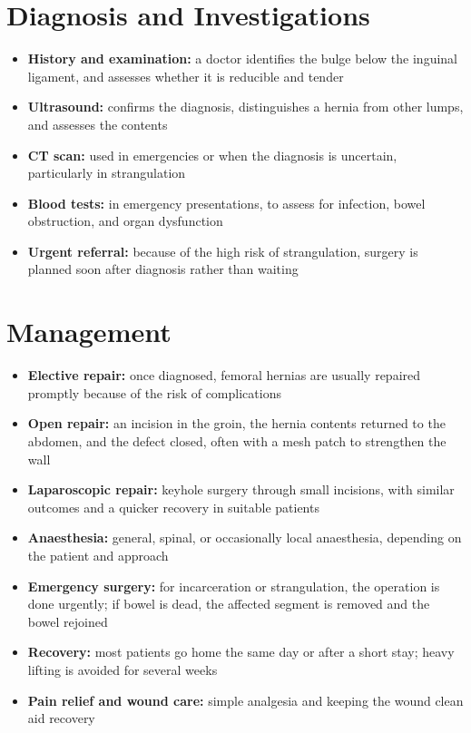 \section*{Diagnosis and Investigations}
\begin{itemize}
    \item \textbf{History and examination:} a doctor identifies the bulge below the inguinal ligament, and assesses whether it is reducible and tender
    \item \textbf{Ultrasound:} confirms the diagnosis, distinguishes a hernia from other lumps, and assesses the contents
    \item \textbf{CT scan:} used in emergencies or when the diagnosis is uncertain, particularly in strangulation
    \item \textbf{Blood tests:} in emergency presentations, to assess for infection, bowel obstruction, and organ dysfunction
    \item \textbf{Urgent referral:} because of the high risk of strangulation, surgery is planned soon after diagnosis rather than waiting
\end{itemize}

\section*{Management}
\begin{itemize}
    \item \textbf{Elective repair:} once diagnosed, femoral hernias are usually repaired promptly because of the risk of complications
    \item \textbf{Open repair:} an incision in the groin, the hernia contents returned to the abdomen, and the defect closed, often with a mesh patch to strengthen the wall
    \item \textbf{Laparoscopic repair:} keyhole surgery through small incisions, with similar outcomes and a quicker recovery in suitable patients
    \item \textbf{Anaesthesia:} general, spinal, or occasionally local anaesthesia, depending on the patient and approach
    \item \textbf{Emergency surgery:} for incarceration or strangulation, the operation is done urgently; if bowel is dead, the affected segment is removed and the bowel rejoined
    \item \textbf{Recovery:} most patients go home the same day or after a short stay; heavy lifting is avoided for several weeks
    \item \textbf{Pain relief and wound care:} simple analgesia and keeping the wound clean aid recovery
\end{itemize}

